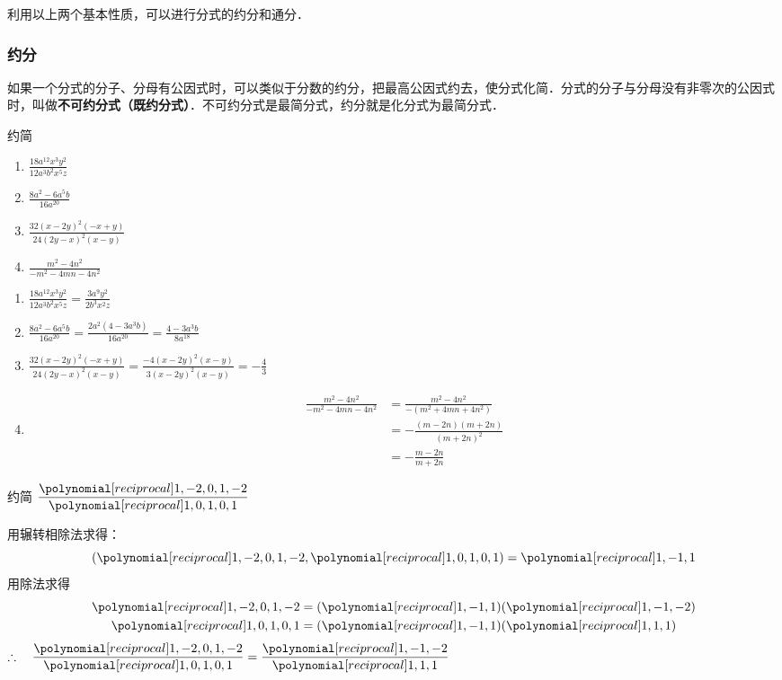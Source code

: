 利用以上两个基本性质，可以进行分式的约分和通分．

\subsubsection{约分}

如果一个分式的分子、分母有公因式时，可以类似于分数的约分，把最高公因式约去，使分式化简．分式的分子与分母没有非零次的公因式时，叫做\textbf{不可约分式（既约分式）}．不可约分式是最简分式，约分就是化分式为最简分式．

\begin{example}
    约简
\begin{enumerate}
    \item $\frac{18 a^{12} x^{3} y^{2}}{12 a^{3} b^{2} x^{5} z}$
    \item $\frac{8 a^{2}-6 a^{5} b}{16 a^{20}}$
    \item $\frac{32(x-2 y)^{2}(-x+y)}{24(2 y-x)^{2}(x-y)}$
    \item $\frac{m^{2}-4 n^{2}}{-m^{2}-4 m n-4 n^{2}}$
\end{enumerate}
\end{example}

\begin{solution}
\begin{enumerate}
    \item $\frac{18 a^{12} x^{3} y^{2}}{12 a^{3} b^{2} x^{5} z}=\frac{3 a^{9} y^{2}}{2 b^{3} x^{2} z}$
    \item $\frac{8 a^{2}-6 a^{5} b}{16 a^{20}}  =\frac{2 a^{2}\left(4-3 a^{3} b\right)}{16 a^{20}} = \frac{4-3 a^{3} b}{8 a^{18}} $
    \item $ \frac{32(x-2 y)^{2}(-x+y)}{24(2 y-x)^{2}(x-y)}  =\frac{-4(x-2 y)^{2}(x-y)}{3(x-2 y)^{2}(x-y)}=-\frac{4}{3}$
    \item \[\begin{split}
        \frac{m^{2}-4 n^{2}}{-m^{2}-4 m n-4 n^{2}} &=
    \frac{m^{2}-4 n^{2}}{-\left(m^{2}+4 m n+4 n^{2}\right)}\\&=-\frac{(m-2n)(m+2n)}{(m+2n)^2}\\&=-\frac{m-2n}{m+2n}
    \end{split} \]
\end{enumerate}
\end{solution}

\begin{example}
    约简 $\frac{\poly{1,-2,0,1,-2}}{\poly{1,0,1,0,1}}$
\end{example}

\begin{solution}
    用辗转相除法求得：
\[(\poly{1,-2,0,1,-2}, \poly{1,0,1,0,1})=\poly{1,-1,1}\]
用除法求得
\[\begin{split}
    \poly{1,-2,0,1,-2}&=(\poly{1,-1,1})(\poly{1,-1,-2})\\
    \poly{1,0,1,0,1}&=(\poly{1,-1,1})(\poly{1,1,1})
\end{split}\]
$\therefore\quad \frac{\poly{1,-2,0,1,-2}}{\poly{1,0,1,0,1}}=\frac{\poly{1,-1,-2}}{\poly{1,1,1}}$
\end{solution}

